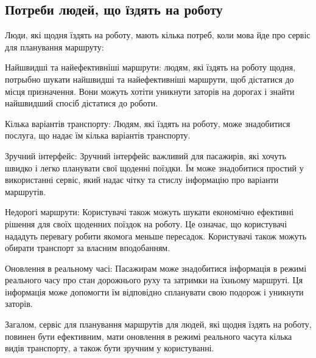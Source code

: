 \subsection{Потреби людей, що їздять на роботу}
\label{subsec:workers-needs-subsection}

Люди, які щодня їздять на роботу, мають кілька потреб, коли мова йде про сервіс для планування маршруту:

Найшвидші та найефективніші маршрути: людям, які їздять на роботу щодня, потрыбно шукати найшвидші та найефективніші маршрути, щоб дістатися до місця призначення. Вони можуть хотіти уникнути заторів на дорогах і знайти найшвидший спосіб дістатися до роботи.

Кілька варіантів транспорту: Людям, які їздять на роботу, може знадобитися послуга, що надає їм кілька варіантів транспорту.

Зручний інтерфейс: Зручний інтерфейс важливий для пасажирів, які хочуть швидко і легко планувати свої щоденні поїздки. Їм може знадобитися простий у використанні сервіс, який надає чітку та стислу інформацію про варіанти маршрутів.

Недорогі маршрути: Користувачі також можуть шукати економічно ефективні рішення для своїх щоденних поїздок на роботу. Це означає, що користувачі нададуть перевагу робити якомога меньше пересадок. Користувачі також можуть обирати транспорт за власним вподобанням.

Оновлення в реальному часі: Пасажирам може знадобитися інформація в режимі реального часу про стан дорожнього руху та затримки на їхньому маршруті. Ця інформація може допомогти їм відповідно спланувати свою подорож і уникнути заторів.

Загалом, сервіс для планування маршрутів для людей, які щодня їздять на роботу, повинен бути ефективним, мати оновлення в режимі реального часута кілька видів транспорту, а також бути зручним у користуванні.